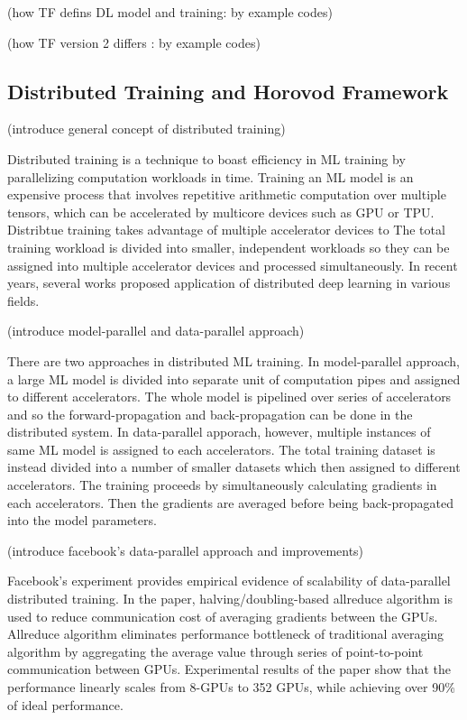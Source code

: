 (how TF defins DL model and training: by example codes)

(how TF version 2 differs : by example codes)

\subsection{Distributed Training and Horovod Framework}

(introduce general concept of distributed training)

Distributed training is a technique to boast efficiency in ML training
by parallelizing computation workloads in time.
Training an ML model is an expensive process that involves repetitive
arithmetic computation over multiple tensors,
which can be accelerated by multicore devices such as GPU or TPU. 
Distribtue training takes advantage of multiple accelerator devices to
The total training workload is divided into smaller, independent workloads
so they can be assigned into multiple accelerator devices and
processed simultaneously. 
In recent years, several works proposed application of distributed
deep learning in various fields.

(introduce model-parallel and data-parallel approach\cite{approaches2019Mao})

There are two approaches in distributed ML training.
In model-parallel approach, a large ML model is divided into separate unit
of computation pipes and assigned to different accelerators. The whole model
is pipelined over series of accelerators and so the forward-propagation and
back-propagation can be done in the distributed system.
In data-parallel apporach, however, multiple instances of same ML model
is assigned to each accelerators. The total training dataset is instead
divided into a number of smaller datasets which then assigned to different
accelerators. The training proceeds by simultaneously calculating gradients
in each accelerators. Then the gradients are averaged before being 
back-propagated into the model parameters.

(introduce facebook's data-parallel approach and improvements)

Facebook's experiment \cite{facebook2018} provides empirical evidence of
scalability of data-parallel distributed training. In the paper, 
halving/doubling-based allreduce algorithm is used to reduce communication cost 
of averaging gradients between the GPUs. 
Allreduce algorithm eliminates performance bottleneck of traditional
averaging algorithm by aggregating the average value through series of
point-to-point communication between GPUs. 
Experimental results of the paper show that the performance linearly
scales from 8-GPUs to 352 GPUs, while achieving over 90\% of ideal performance.

